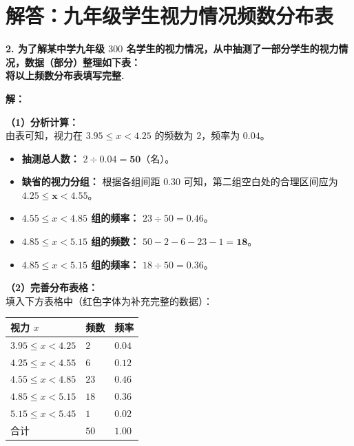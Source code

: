 \newpage



\section{解答：九年级学生视力情况频数分布表}

\vspace{0.6cm}

\textbf{2. 为了解某中学九年级 $300$ 名学生的视力情况，从中抽测了一部分学生的视力情况，数据（部分）整理如下表：}\\
\textbf{将以上频数分布表填写完整.}

\vspace{0.4cm}

\textbf{解：}

\textbf{（1）分析计算：} \\
由表可知，视力在 $3.95 \leqslant x < 4.25$ 的频数为 $2$，频率为 $0.04$。
\begin{itemize}
  \item \textbf{抽测总人数：} $2 \div 0.04 = \boldsymbol{50}$（名）。
  \item \textbf{缺省的视力分组：} 根据各组间距 $0.30$ 可知，第二组空白处的合理区间应为 $\boldsymbol{4.25 \leqslant x < 4.55}$。
  \item \textbf{$4.55 \leqslant x < 4.85$ 组的频率：} $23 \div 50 = \boldsymbol{0.46}$。
  \item \textbf{$4.85 \leqslant x < 5.15$ 组的频数：} $50 - 2 - 6 - 23 - 1 = \boldsymbol{18}$。
  \item \textbf{$4.85 \leqslant x < 5.15$ 组的频率：} $18 \div 50 = \boldsymbol{0.36}$。
\end{itemize}

\textbf{（2）完善分布表格：} \\
填入下方表格中（红色字体为补充完整的数据）：

\vspace{0.2cm}
\begin{center}
\renewcommand{\arraystretch}{1.5}
\begin{tabular}{|>{\centering\arraybackslash}p{4cm}|>{\centering\arraybackslash}p{3cm}|>{\centering\arraybackslash}p{3cm}|}
  \hline
  \cellcolor{gray!15} 视力 $x$ & \cellcolor{gray!15} 频数 & \cellcolor{gray!15} 频率 \\
  \hline
  $3.95 \leqslant x < 4.25$ & $2$ & $0.04$ \\
  \hline
  \textbf{\textcolor{red!70!black}{$4.25 \leqslant x < 4.55$}} & $6$ & $0.12$ \\
  \hline
  $4.55 \leqslant x < 4.85$ & $23$ & \textbf{\textcolor{red!70!black}{$0.46$}} \\
  \hline
  $4.85 \leqslant x < 5.15$ & \textbf{\textcolor{red!70!black}{$18$}} & \textbf{\textcolor{red!70!black}{$0.36$}} \\
  \hline
  $5.15 \leqslant x < 5.45$ & $1$ & $0.02$ \\
  \hline
  合计 & \textbf{\textcolor{red!70!black}{$50$}} & $1.00$ \\
  \hline
\end{tabular}
\end{center}

